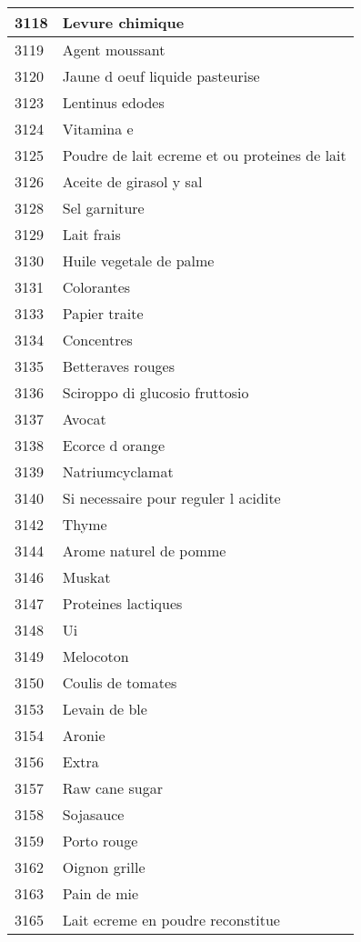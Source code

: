 \begin{longtable}{|l|l|}
3118 & Levure chimique \\ \hline 
3119 & Agent moussant \\ \hline 
3120 & Jaune d oeuf liquide pasteurise \\ \hline 
3123 & Lentinus edodes \\ \hline 
3124 & Vitamina e \\ \hline 
3125 & Poudre de lait ecreme et ou proteines de lait \\ \hline 
3126 & Aceite de girasol y sal \\ \hline 
3128 & Sel garniture \\ \hline 
3129 & Lait frais \\ \hline 
3130 & Huile vegetale de palme \\ \hline 
3131 & Colorantes \\ \hline 
3133 & Papier traite \\ \hline 
3134 & Concentres \\ \hline 
3135 & Betteraves rouges \\ \hline 
3136 & Sciroppo di glucosio fruttosio \\ \hline 
3137 & Avocat \\ \hline 
3138 & Ecorce d orange \\ \hline 
3139 & Natriumcyclamat \\ \hline 
3140 & Si necessaire pour reguler l acidite \\ \hline 
3142 & Thyme \\ \hline 
3144 & Arome naturel de pomme \\ \hline 
3146 & Muskat \\ \hline 
3147 & Proteines lactiques \\ \hline 
3148 & Ui \\ \hline 
3149 & Melocoton \\ \hline 
3150 & Coulis de tomates \\ \hline 
3153 & Levain de ble \\ \hline 
3154 & Aronie \\ \hline 
3156 & Extra \\ \hline 
3157 & Raw cane sugar \\ \hline 
3158 & Sojasauce \\ \hline 
3159 & Porto rouge \\ \hline 
3162 & Oignon grille \\ \hline 
3163 & Pain de mie \\ \hline 
3165 & Lait ecreme en poudre reconstitue \\ \hline 

\end{longtable}
